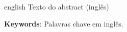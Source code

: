 \begin{resumo}[Abstract]
	
	\begin{otherlanguage*}{english}
		Texto do abstract (inglês)
		
		\vspace{\onelineskip}
		
		\noindent 
		\textbf{Keywords}: Palavras chave em inglês.
	\end{otherlanguage*}

\end{resumo}

